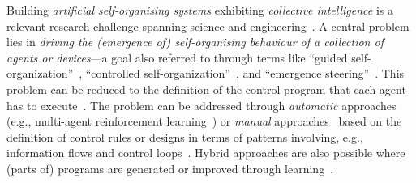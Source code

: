 
Building \emph{artificial self-organising systems} 
 exhibiting \emph{collective intelligence}
 is a relevant research challenge 
 spanning science and engineering~\cite{DBLP:journals/ker/ParunakB15,gershenson2007design-sos,DBLP:conf/uksim/SinghSP13,DBLP:journals/sttt/NicolaJW20}.
%
A central problem lies in \emph{driving the (emergence of) self-organising behaviour
of a collection of agents or devices}---a goal also referred to through terms like
``guided self-organization''~\cite{prokopenko2009guided-selforg},
``controlled self-organization''~\cite{DBLP:journals/taas/SchmeckMCMR10}, and
``emergence steering''~\cite{Varenne2015morpho,DBLP:conf/sysose/Giammarco17a}.
%
This problem can be reduced to the definition of the control program
 that each agent has to execute~\cite{DBLP:journals/tib/MartiusH12}.
%
The problem can be addressed
 through \emph{automatic} approaches
(e.g., multi-agent reinforcement learning~\cite{DBLP:journals/corr/abs-1911-10635})
 or \emph{manual} approaches~\cite{DBLP:journals/tib/MartiusH12}
 based on the definition of control rules or 
 designs in terms of patterns involving, e.g.,
information flows and control loops~\cite{DBLP:conf/saso/WolfH07}.
%
Hybrid approaches are also possible where (parts of) programs
are generated or improved through learning~\cite{DBLP:conf/coordination/AguzziCV22}.

